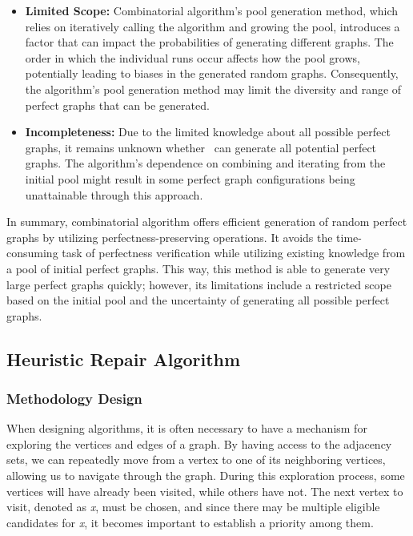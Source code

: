 \begin{itemize}
\item \textbf{Limited Scope:} Combinatorial algorithm's pool generation method, which relies on iteratively calling the algorithm and growing the pool, introduces a factor that can impact the probabilities of generating different graphs. The order in which the individual runs occur affects how the pool grows, potentially leading to biases in the generated random graphs. Consequently, the algorithm's pool generation method may limit the diversity and range of perfect graphs that can be generated.

\item \textbf{Incompleteness:} Due to the limited knowledge about all possible perfect graphs, it remains unknown whether \PerfectGen\ can generate all potential perfect graphs. The algorithm's dependence on combining and iterating from the initial pool might result in some perfect graph configurations being unattainable through this approach.
\end{itemize}

In summary, combinatorial algorithm offers efficient generation of random perfect graphs by utilizing perfectness-preserving operations. It avoids the time-consuming task of perfectness verification while utilizing existing knowledge from a pool of initial perfect graphs. This way, this method is able to generate very large perfect graphs quickly; however, its limitations include a restricted scope based on the initial pool and the uncertainty of generating all possible perfect graphs.

\subsection{Heuristic Repair Algorithm}
\subsubsection{Methodology Design}
When designing algorithms, it is often necessary to have a mechanism for exploring the vertices and edges of a graph. By having access to the adjacency sets, we can repeatedly move from a vertex to one of its neighboring vertices, allowing us to navigate through the graph. During this exploration process, some vertices will have already been visited, while others have not. The next vertex to visit, denoted as \textit{x}, must be chosen, and since there may be multiple eligible candidates for \textit{x}, it becomes important to establish a priority among them.

